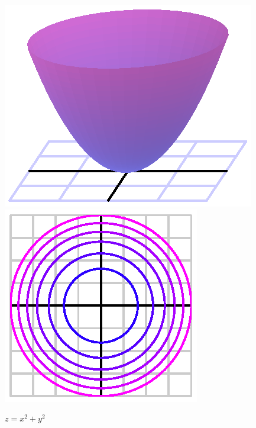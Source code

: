 \begin{figure}[ht]
  \begin{center}
    \includegraphics{figures/zisr2.eps}
    \hspace*{30pt}
    \includegraphics{figures/zisr2_contours.eps}
  \end{center}
  \caption{$z=x^2+y^2$}
\end{figure}
